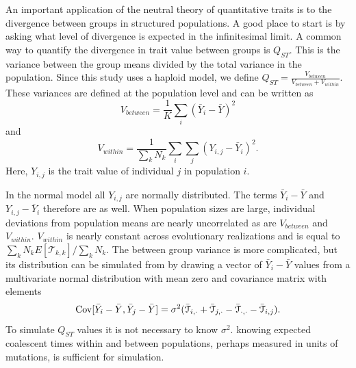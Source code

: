 An important application of the neutral theory of quantitative traits is to the
divergence between groups in structured populations. A good place to start is by
asking what level of divergence is expected in the infinitesimal limit. A common
way to quantify the divergence in trait value between groups is $Q_{ST}$. This
is the variance between the group means divided by the total variance in the
population. Since this study uses a haploid model, we define
$Q_{ST} = \frac{V_{between}}{V_{between} + V_{within}}$. These variances are
defined at the population level and can be written as
\begin{equation*}
  V_{between} = \frac{1}{K} \sum_i \left( \bar{Y}_i - \bar{Y} \right)^2
\end{equation*}
and
\begin{equation*}
  V_{within} = \frac{1}{\sum_k N_k} \sum_i \sum_j \left( Y_{i,j} - \bar{Y}_i \right)^2.
\end{equation*}
Here, $Y_{i,j}$ is the trait value of individual $j$ in population $i$.

In the normal model all $Y_{i,j}$ are normally distributed. The terms
$\bar{Y}_{i} - \bar{Y}$ and $Y_{i,j} - \bar{Y}_i$ therefore are as well. When
population sizes are large, individual deviations from population means are
nearly uncorrelated as are $V_{between}$ and $V_{within}$. $V_{within}$ is
nearly constant across evolutionary realizations and is equal to
$\sum_k N_k E[\mathcal{T}_{k,k}] / \sum_k N_k$. The between group variance is more
complicated, but its distribution can be simulated from by drawing a vector of
$\bar{Y}_{i} - \bar{Y}$ values from a multivariate normal distribution with mean
zero and covariance matrix with elements
\begin{equation}
  \mathrm{Cov}[\bar{Y}_{i} - \bar{Y}, \bar{Y}_{j} - \bar{Y}] =
  \sigma^2(\bar{\mathcal{T}}_{i,\cdot} + \bar{\mathcal{T}}_{j,\cdot} -
  \bar{\mathcal{T}}_{\cdot,\cdot} - \bar{\mathcal{T}}_{i,j}).
\end{equation}
To simulate $Q_{ST}$ values it is not necessary to know $\sigma^2$. knowing
expected coalescent times within and between populations, perhaps measured in
units of mutations, is sufficient for simulation.

